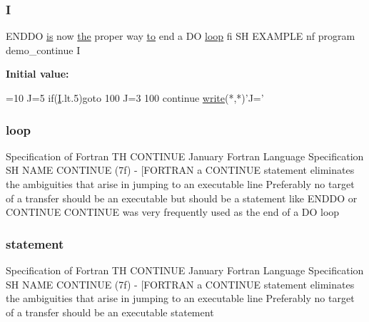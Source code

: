 \subsubsection{\texorpdfstring{I}{I}}
{\footnotesize\ttfamily E\+N\+D\+DO \hyperlink{intro__blas1_83_8txt_a42a91df93f840595de3019ceb5d1df23}{is} now \hyperlink{M__stopwatch_83_8txt_a0f266597de2e57eb3aa964927bb30e14}{the} proper way \hyperlink{M__stopwatch_83_8txt_a97209fd3e34ef701c0a9734280779cbb}{to} end a DO \hyperlink{continue_87_8txt_a5094e6a64d1227c84a0bf4db8f6c3788}{loop} fi SH E\+X\+A\+M\+P\+LE nf program demo\+\_\+continue I}

{\bfseries Initial value\+:}
\begin{DoxyCode}
=10
         J=5
         \textcolor{keywordflow}{if}(\hyperlink{continue_87_8txt_ae7b8826453d28f1bdb2fba7e889eb23b}{I}.lt.5)\textcolor{keywordflow}{goto} 100
         J=3
   100   \textcolor{keywordflow}{continue}
         \hyperlink{namespacem__logic_a487df89eac953b22a40b143aaf8ff1ea}{write}(*,*)\textcolor{stringliteral}{'J='}
\end{DoxyCode}
\mbox{\label{continue_87_8txt_a5094e6a64d1227c84a0bf4db8f6c3788}} 
\subsubsection{\texorpdfstring{loop}{loop}}
{\footnotesize\ttfamily Specification of Fortran TH C\+O\+N\+T\+I\+N\+UE January Fortran Language Specification SH N\+A\+ME C\+O\+N\+T\+I\+N\+UE (7f) -\/ \mbox{[}\+F\+O\+R\+T\+R\+A\+N a C\+O\+N\+T\+I\+N\+U\+E statement eliminates the ambiguities that arise in jumping to an executable line Preferably no target of a transfer should be an executable but should be a statement like E\+N\+D\+D\+O or C\+O\+N\+T\+I\+N\+U\+E C\+O\+N\+T\+I\+N\+U\+E was very frequently used as the end of a D\+O loop}

\mbox{\label{continue_87_8txt_ab499dad98bb4e44fe84dabd1bf0fa987}} 
\subsubsection{\texorpdfstring{statement}{statement}}
{\footnotesize\ttfamily Specification of Fortran TH C\+O\+N\+T\+I\+N\+UE January Fortran Language Specification SH N\+A\+ME C\+O\+N\+T\+I\+N\+UE (7f) -\/ \mbox{[}\+F\+O\+R\+T\+R\+A\+N a C\+O\+N\+T\+I\+N\+U\+E statement eliminates the ambiguities that arise in jumping to an executable line Preferably no target of a transfer should be an executable statement}


